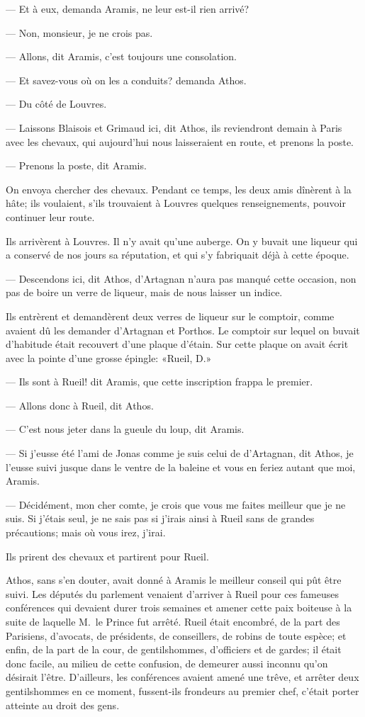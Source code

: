 — Et à eux, demanda Aramis, ne leur est-il rien arrivé?

— Non, monsieur, je ne crois pas.

— Allons, dit Aramis, c'est toujours une consolation.

— Et savez-vous où on les a conduits? demanda Athos.

— Du côté de Louvres.

— Laissons Blaisois et Grimaud ici, dit Athos, ils reviendront demain à Paris avec les chevaux, qui aujourd'hui nous laisseraient en route, et prenons la poste.

— Prenons la poste, dit Aramis.

On envoya chercher des chevaux. Pendant ce temps, les deux amis dînèrent à la hâte; ils voulaient, s'ils trouvaient à Louvres quelques renseignements, pouvoir continuer leur route.

Ils arrivèrent à Louvres. Il n'y avait qu'une auberge. On y buvait une liqueur qui a conservé de nos jours sa réputation, et qui s'y fabriquait déjà à cette époque.

— Descendons ici, dit Athos, d'Artagnan n'aura pas manqué cette occasion, non pas de boire un verre de liqueur, mais de nous laisser un indice.

Ils entrèrent et demandèrent deux verres de liqueur sur le comptoir, comme avaient dû les demander d'Artagnan et Porthos. Le comptoir sur lequel on buvait d'habitude était recouvert d'une plaque d'étain. Sur cette plaque on avait écrit avec la pointe d'une grosse épingle: «Rueil, D.»

— Ils sont à Rueil! dit Aramis, que cette inscription frappa le premier.

— Allons donc à Rueil, dit Athos.

— C'est nous jeter dans la gueule du loup, dit Aramis.

— Si j'eusse été l'ami de Jonas comme je suis celui de d'Artagnan, dit Athos, je l'eusse suivi jusque dans le ventre de la baleine et vous en feriez autant que moi, Aramis.

— Décidément, mon cher comte, je crois que vous me faites meilleur que je ne suis. Si j'étais seul, je ne sais pas si j'irais ainsi à Rueil sans de grandes précautions; mais où vous irez, j'irai.

Ils prirent des chevaux et partirent pour Rueil.

Athos, sans s'en douter, avait donné à Aramis le meilleur conseil qui pût être suivi. Les députés du parlement venaient d'arriver à Rueil pour ces fameuses conférences qui devaient durer trois semaines et amener cette paix boiteuse à la suite de laquelle M.~le Prince fut arrêté. Rueil était encombré, de la part des Parisiens, d'avocats, de présidents, de conseillers, de robins de toute espèce; et enfin, de la part de la cour, de gentilshommes, d'officiers et de gardes; il était donc facile, au milieu de cette confusion, de demeurer aussi inconnu qu'on désirait l'être. D'ailleurs, les conférences avaient amené une trêve, et arrêter deux gentilshommes en ce moment, fussent-ils frondeurs au premier chef, c'était porter atteinte au droit des gens.

